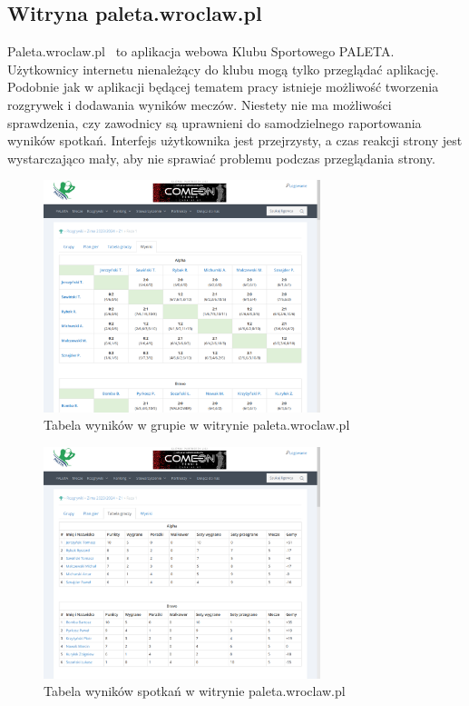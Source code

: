 \documentclass[shortabstract]{iithesis}
\begin{document}
\subsection{Witryna paleta.wroclaw.pl}
Paleta.wroclaw.pl~\cite{PaletaWroclaw} to aplikacja webowa Klubu Sportowego PALETA.
Użytkownicy internetu nienależący do klubu mogą tylko przeglądać aplikację.
Podobnie jak w aplikacji będącej tematem pracy istnieje możliwość tworzenia rozgrywek i dodawania wyników meczów.
Niestety nie ma możliwości sprawdzenia, czy zawodnicy są uprawnieni do samodzielnego raportowania wyników spotkań.
Interfejs użytkownika jest przejrzysty, a czas reakcji strony jest wystarczająco mały, aby nie sprawiać problemu podczas przeglądania strony.
\begin{figure}[H]
    \centering
    \includegraphics[width=0.72\textwidth,valign=t]{assets/alt_rozw/paleta_wyniki.png}
    \caption{Tabela wyników w grupie w witrynie paleta.wroclaw.pl}
\end{figure}
\begin{figure}[H]
    \centering
    \includegraphics[width=0.72\textwidth,valign=t]{assets/alt_rozw/paleta_tabela.png}
    \caption{Tabela wyników spotkań w witrynie paleta.wroclaw.pl}
\end{figure}
\end{document}
